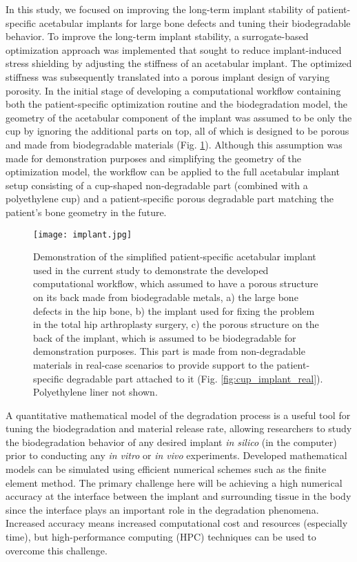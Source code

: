 In this study, we focused on improving the long-term implant stability of patient-specific acetabular implants for large bone defects and tuning their biodegradable behavior. To improve the long-term implant stability, a surrogate-based optimization approach was implemented that sought to reduce implant-induced stress shielding by adjusting the stiffness of an acetabular implant. The optimized stiffness was subsequently translated into a porous implant design of varying porosity. In the initial stage of developing a computational workflow containing both the patient-specific optimization routine and the biodegradation model, the geometry of the acetabular component of the implant was assumed to be only the cup by ignoring the additional parts on top, all of which is designed to be porous and made from biodegradable materials (Fig. \ref{fig:cup_implant}). Although this assumption was made for demonstration purposes and simplifying the geometry of the optimization model, the workflow can be applied to the full acetabular implant setup consisting of a cup-shaped non-degradable part (combined with a polyethylene cup) and a patient-specific porous degradable part matching the patient's bone geometry in the future.

\begin{figure}[h]
\centering
\medskip
\texttt{[image: implant.jpg]}
\caption[Demonstration of the simplified patient-specific acetabular implant]{Demonstration of the simplified patient-specific acetabular implant used in the current study to demonstrate the developed computational workflow, which assumed to have a porous structure on its back made from biodegradable metals, a) the large bone defects in the hip bone, b) the implant used for fixing the problem in the total hip arthroplasty surgery, c) the porous structure on the back of the implant, which is assumed to be biodegradable for demonstration purposes. This part is made from non-degradable materials in real-case scenarios to provide support to the patient-specific degradable part attached to it (Fig. \ref{fig:cup_implant_real}). Polyethylene liner not shown.} \label{fig:cup_implant}
\end{figure}

A quantitative mathematical model of the degradation process is a useful tool for tuning the biodegradation and material release rate, allowing researchers to study the biodegradation behavior of any desired implant \textit{in silico} (in the computer) prior to conducting any \textit{in vitro} or \textit{in vivo} experiments. Developed mathematical models can be simulated using efficient numerical schemes such as the finite element method. The primary challenge here will be achieving a high numerical accuracy at the interface between the implant and surrounding tissue in the body since the interface plays an important role in the degradation phenomena. Increased accuracy means increased computational cost and resources (especially time), but high-performance computing (\gls{HPC}) techniques can be used to overcome this challenge.

